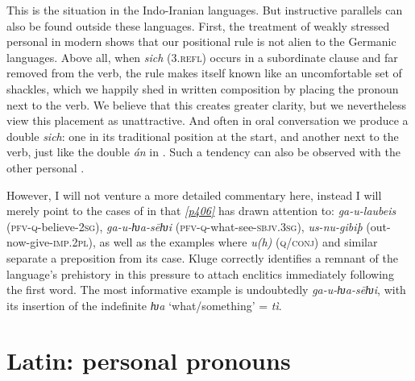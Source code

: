 This is the situation in the Indo-Iranian languages. But instructive parallels can also be found outside these languages. First, the treatment of weakly stressed personal  in modern  shows that our positional rule is not alien to the Germanic languages. Above all, when \emph{sich} (\textsc{3.refl}) occurs in a subordinate clause and far removed from the verb, the rule makes itself known like an uncomfortable set of shackles, which we happily shed in written composition by placing the pronoun next to the verb. We believe that this creates greater clarity, but we nevertheless view this placement as unattractive. And often in oral conversation we produce a double \emph{sich}: one in its traditional position at the start, and another next to the verb, just like the double \emph{án} in . Such a tendency can also be observed with the other personal .

However, I will not venture a more detailed commentary here, instead  {I will merely point } to the cases of  in  that \citet[80]{Kluge1883} \hyperlink{p406}{\emph{[p406]}} has drawn attention to: \emph{ga-\emph{u}-laubeis} (\textsc{pfv}-\textsc{q}-believe-\textsc{2sg}), \emph{ga-\emph{u}-ƕa-sēƕi} (\textsc{pfv}-\textsc{q}-what-see-\textsc{sbjv.3sg}), \emph{us-\emph{nu}-gibiþ} (out-now-give-\textsc{imp.2pl}), as well as the examples  {where} \emph{u(h)} (\textsc{q}/\textsc{conj}) and similar   separate a preposition from its case. Kluge correctly identifies a remnant of the language's prehistory in this pressure to attach enclitics immediately following the first word. The most informative example is undoubtedly \emph{ga-u-ƕa-sēƕi}, with its insertion of the indefinite \emph{ƕa} `what/something' =  \textit{tì}.


\section{Latin: personal pronouns}

